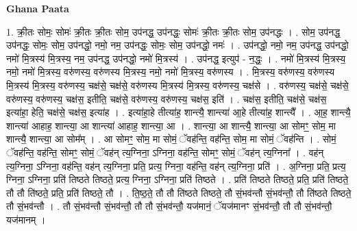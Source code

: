 \documentclass[17pt]{extarticle}
\begin{document}
\textbf{Ghana Paata } \newline

1. क्री॒तः सोमः॒ सोमः॑ क्री॒तः क्री॒तः सोम॒ उप॑नद्ध॒ उप॑नद्धः॒ सोमः॑ क्री॒तः क्री॒तः सोम॒ उप॑नद्धः । . सोम॒ उप॑नद्ध॒ उप॑नद्धः॒ सोमः॒ सोम॒ उप॑नद्धो॒ नमो॒ नम॒ उप॑नद्धः॒ सोमः॒ सोम॒ उप॑नद्धो॒ नमः॑ । . उप॑नद्धो॒ नमो॒ नम॒ उप॑नद्ध॒ उप॑नद्धो॒ नमो॑ मि॒त्रस्य॑ मि॒त्रस्य॒ नम॒ उप॑नद्ध॒ उप॑नद्धो॒ नमो॑ मि॒त्रस्य॑ । . उप॑नद्ध॒ इत्युप॑ - न॒द्धः॒ । . नमो॑ मि॒त्रस्य॑ मि॒त्रस्य॒ नमो॒ नमो॑ मि॒त्रस्य॒ वरु॑णस्य॒ वरु॑णस्य मि॒त्रस्य॒ नमो॒ नमो॑ मि॒त्रस्य॒ वरु॑णस्य । . मि॒त्रस्य॒ वरु॑णस्य॒ वरु॑णस्य मि॒त्रस्य॑ मि॒त्रस्य॒ वरु॑णस्य॒ चक्ष॑से॒ चक्ष॑से॒ वरु॑णस्य मि॒त्रस्य॑ मि॒त्रस्य॒ वरु॑णस्य॒ चक्ष॑से । . वरु॑णस्य॒ चक्ष॑से॒ चक्ष॑से॒ वरु॑णस्य॒ वरु॑णस्य॒ चक्ष॑स॒ इतीति॒ चक्ष॑से॒ वरु॑णस्य॒ वरु॑णस्य॒ चक्ष॑स॒ इति॑ । . चक्ष॑स॒ इतीति॒ चक्ष॑से॒ चक्ष॑स॒ इत्या॑हा॒ हेति॒ चक्ष॑से॒ चक्ष॑स॒ इत्या॑ह । . इत्या॑हा॒हे तीत्या॑ह॒ शान्त्यै॒ शान्त्या॑ आ॒हे तीत्या॑ह॒ शान्त्यै᳚ । . आ॒ह॒ शान्त्यै॒ शान्त्या॑ आहाह॒ शान्त्या॒ आ शान्त्या॑ आहाह॒ शान्त्या॒ आ । . शान्त्या॒ आ शान्त्यै॒ शान्त्या॒ आ सोमꣳ॒॒ सोम॒ मा शान्त्यै॒ शान्त्या॒ आ सोम᳚म् । . आ सोमꣳ॒॒ सोम॒ मा सोमं॒ ॅवह॑न्ति॒ वह॑न्ति॒ सोम॒ मा सोमं॒ ॅवह॑न्ति । . सोमं॒ ॅवह॑न्ति॒ वह॑न्ति॒ सोमꣳ॒॒ सोमं॒ ॅवह॑न् त्य॒ग्निना॒ ऽग्निना॒ वह॑न्ति॒ सोमꣳ॒॒ सोमं॒ ॅवह॑न् त्य॒ग्निना᳚ । . वह॑न् त्य॒ग्निना॒ ऽग्निना॒ वह॑न्ति॒ वह॑न् त्य॒ग्निना॒ प्रति॒ प्रत्य॒ ग्निना॒ वह॑न्ति॒ वह॑न् त्य॒ग्निना॒ प्रति॑ । . अ॒ग्निना॒ प्रति॒ प्रत्य॒ ग्निना॒ ऽग्निना॒ प्रति॑ तिष्ठते तिष्ठते॒ प्रत्य॒ ग्निना॒ ऽग्निना॒ प्रति॑ तिष्ठते । . प्रति॑ तिष्ठते तिष्ठते॒ प्रति॒ प्रति॑ तिष्ठते॒ तौ तौ ति॑ष्ठते॒ प्रति॒ प्रति॑ तिष्ठते॒ तौ । . ति॒ष्ठ॒ते॒ तौ तौ ति॑ष्ठते तिष्ठते॒ तौ सं॒भव॑न्तौ सं॒भव॑न्तौ॒ तौ ति॑ष्ठते तिष्ठते॒ तौ सं॒भव॑न्तौ । . तौ सं॒भव॑न्तौ सं॒भव॑न्तौ॒ तौ तौ सं॒भव॑न्तौ॒ यज॑मानं॒ ॅयज॑मानꣳ सं॒भव॑न्तौ॒ तौ तौ सं॒भव॑न्तौ॒ यज॑मानम् । \newline
\end{document}
